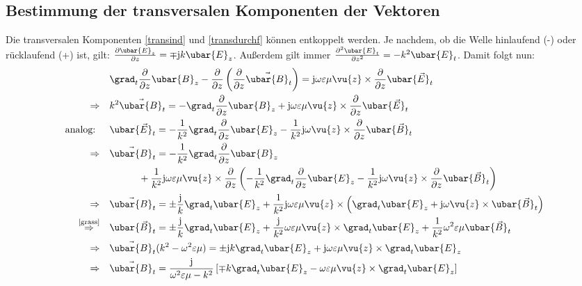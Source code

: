 \subsection{Bestimmung der transversalen Komponenten der Vektoren}
	Die transversalen Komponenten \ref{transind} und \ref{transdurchf}
	können entkoppelt werden. Je nachdem, ob die Welle hinlaufend (-) oder rücklaufend (+) ist, gilt: \(\frac{\partial \ubar{E}_z}{\partial z} = \mp \mathrm{j} k \ubar{E}_z\). Außerdem gilt immer \(\frac{\partial^2 \ubar{E}_t}{\partial z^2} = -  k^2 \ubar{E}_t\). Damit folgt nun: 
	\begin{equation}\begin{split}
		&\grad _t \frac{\partial}{\partial z}\ubar{B}_{z} - \frac{\partial}{\partial z}\left(\frac{\partial}{\partial z}\vec{\ubar{B}}_t\right) = \mathrm{j}\omega\varepsilon\mu \vu{z}\times \frac{\partial}{\partial z}\ubar{\vec{E}}_t\\
		\Rightarrow \quad &k^2 \vec{\ubar{B}}_t = -\grad _t \frac{\partial}{\partial z}\ubar{B}_{z}+\mathrm{j}\omega\varepsilon\mu \vu{z}\times \frac{\partial}{\partial z}\ubar{\vec{E}}_t\\
		\text{analog: } \quad &\ubar{\vec{E}}_t =-\frac{1}{k^2}\grad _t \frac{\partial}{\partial z}\ubar{E}_{z}-\frac{1}{k^2}\mathrm{j}\omega \vu{z}\times \frac{\partial}{\partial z}\ubar{\vec{B}}_t\\
		\Rightarrow \quad &\vec{\ubar{B}}_t = -\frac{1}{k^2}\grad _t \frac{\partial}{\partial z}\ubar{B}_{z}\\&\quad\quad\quad+\frac{1}{k^2}\mathrm{j}\omega\varepsilon\mu \vu{z}\times \frac{\partial}{\partial z}\left(-\frac{1}{k^2}\grad _t \frac{\partial}{\partial z}\ubar{E}_{z}-\frac{1}{k^2}\mathrm{j}\omega \vu{z}\times \frac{\partial}{\partial z}\ubar{\vec{B}}_t\right)\\
		\Rightarrow \quad &\vec{\ubar{B}}_t = \pm \frac{\mathrm{j}}{k}\grad _t\ubar{E}_{z}+\frac{1}{k^2}\mathrm{j}\omega\varepsilon\mu \vu{z}\times \left(\grad _t \ubar{E}_{z}+\mathrm{j}\omega \vu{z}\times \ubar{\vec{B}}_t\right)\\
		\stackrel{\text{\ref{grass}}}{\Rightarrow} \quad &\ubar{\vec{B}}_t = \pm \frac{\mathrm{j}}{k}\grad _t\ubar{E}_{z}+\frac{\mathrm{j}}{k^2}\omega\varepsilon\mu \vu{z} \times\grad _t \ubar{E}_{z}+\frac{\mathrm{1}}{k^2}\omega^2\varepsilon\mu  \ubar{\vec{B}}_t\\
		\Rightarrow \quad & \vec{\ubar{B}}_t(k^2-\omega^2\varepsilon\mu)=\pm \mathrm{j}k\grad _t\ubar{E}_{z}+\mathrm{j}\omega\varepsilon\mu \vu{z} \times\grad _t \ubar{E}_{z}\\
		\Rightarrow \quad & \vec{\ubar{B}}_t = \frac{\mathrm{j}}{\omega^2\varepsilon\mu-k^2}\left[\mp k\grad _t\ubar{E}_{z}-\omega\varepsilon\mu \vu{z} \times\grad _t \ubar{E}_{z} \right]
	\end{split}\end{equation}
